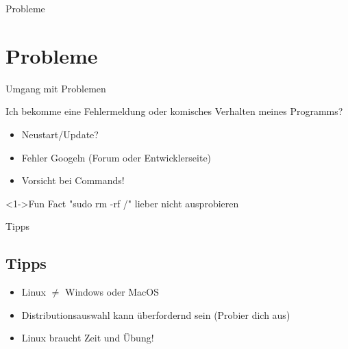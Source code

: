 
\begin{frame}{Probleme}
    \section{Probleme}\label{sec:probleme}

\end{frame}

\begin{frame}{Umgang mit Problemen}

    Ich bekomme eine Fehlermeldung oder komisches Verhalten meines Programms?

    \begin{itemize}
        \item Neustart/Update?
        \item Fehler Googeln (Forum oder Entwicklerseite)
        \item Vorsicht bei Commands!
    \end{itemize}

    \vspace{0.5cm}
    \begin{exampleblock}<1->{Fun Fact}
        "sudo rm -rf /" lieber nicht ausprobieren
    \end{exampleblock}

\end{frame}

\begin{frame}{Tipps}
    \subsection{Tipps}\label{subsec:tipps}

    \begin{itemize}
        \item {Linux $\neq$ Windows oder MacOS}
        \item Distributionsauswahl kann überfordernd sein (Probier dich aus)
        \item Linux braucht Zeit und Übung!
    \end{itemize}

\end{frame}
